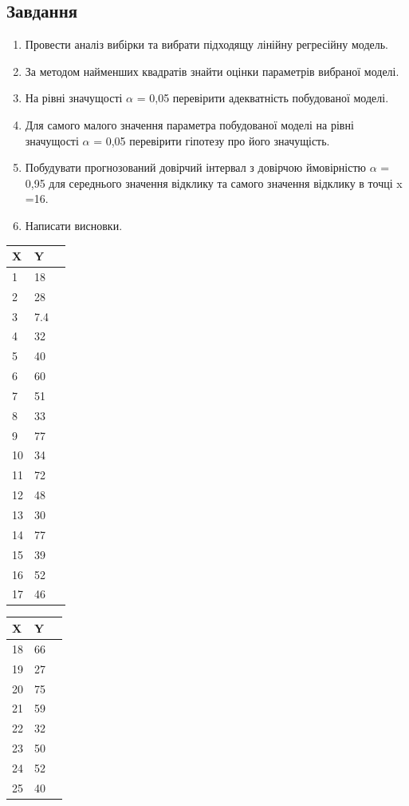 \documentclass{article}
\begin{document}
    \subsection{Завдання}
      \begin{enumerate}
        \item Провести аналіз вибірки та вибрати підходящу лінійну регресійну модель.
        \item За методом найменших квадратів знайти оцінки параметрів вибраної моделі.
        \item На рівні значущості $\alpha$ = 0,05 перевірити адекватність побудованої моделі.
        \item Для самого малого значення параметра побудованої моделі на рівні значущості
        $\alpha$ = 0,05 перевірити гіпотезу про його значущість.
        \item Побудувати прогнозований довірчий інтервал з довірчою ймовірністю $\alpha$ = 0,95 
        для середнього значення відклику та самого значення відклику в точці x =16.
        \item Написати висновки.
      \end{enumerate}
      \begin{center}
        \begin{tabular}{| l | l | l |}
          \hline
          X & Y \\
          \hline
          1 & 18 \\
          2 & 28 \\
          3 & 7.4 \\
          4 & 32 \\
          5 & 40 \\
          6 & 60 \\
          7 & 51 \\
          8 & 33 \\
          9 & 77 \\
          10 & 34 \\
          11 & 72 \\
          12 & 48 \\
          13 & 30 \\
          14 & 77 \\
          15 & 39 \\
          16 & 52 \\
          17 & 46 \\
          \hline
        \end{tabular}
        \;\;\;\;\;\;\;\;\;\;\;\;\;\;\;\;
        \begin{tabular}{| l | l | l |}
          \hline
          X & Y \\
          \hline
          18 & 66 \\
          19 & 27 \\
          20 & 75 \\
          21 & 59 \\
          22 & 32 \\
          23 & 50 \\
          24 & 52 \\
          25 & 40 \\
          \hline
        \end{tabular}
      \end{center}
\end{document}
